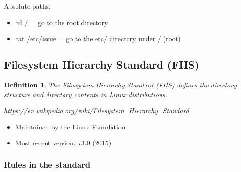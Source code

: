 \documentclass{article}
\newtheorem{theorem}{Definition}[section]
\begin{document}
Absolute paths:

\begin{itemize}
    \item cd / = go to the root directory
    \item cat /etc/issue = go to the etc/ directory under / (root)
\end{itemize}

\subsection{Filesystem Hierarchy Standard (FHS)}

\begin{theorem}
    The Filesystem Hierarchy Standard (FHS) defines the directory structure
    and directory contents in Linux distributions. 
    
    \url{https://en.wikipedia.org/wiki/Filesystem_Hierarchy_Standard}
\end{theorem}

\begin{itemize}
    \item Maintained by the Linux Foundation
    \item Most recent version: v3.0 (2015)
\end{itemize}

\subsubsection{Rules in the standard}
\end{document}
